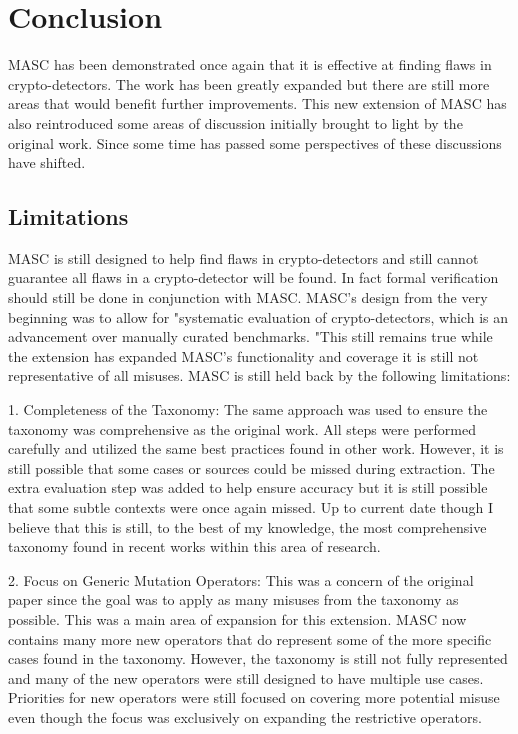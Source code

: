\chapter{Conclusion}
\label{chap_conclusion}

MASC has been demonstrated once again that it is effective at finding flaws in crypto-detectors. The work has been greatly expanded but there are still more areas that would benefit further improvements. This new extension of MASC has also reintroduced some areas of discussion initially brought to light by the original work. Since some time has passed some perspectives of these discussions have shifted.

\section{Limitations}
\label{ch6:sec:limitations}

MASC is still designed to help find flaws in crypto-detectors and still cannot guarantee all flaws in a crypto-detector will be found. In fact formal verification should still be done in conjunction with MASC. MASC's design from the very beginning was to allow for "systematic evaluation of crypto-detectors, which is an advancement over manually curated benchmarks. "This still remains true while the extension has expanded MASC's functionality and coverage it is still not representative of all misuses. MASC is still held back by the following limitations:

1. Completeness of the Taxonomy: The same approach was used to ensure the taxonomy was comprehensive as the original work. All steps were performed carefully and utilized the same best practices found in other work. However, it is still possible that some cases or sources could be missed during extraction. The extra evaluation step was added to help ensure accuracy but it is still possible that some subtle contexts were once again missed. Up to current date though I believe that this is still, to the best of my knowledge, the most comprehensive taxonomy found in recent works within this area of research.

2. Focus on Generic Mutation Operators: This was a concern of the original paper since the goal was to apply as many misuses from the taxonomy as possible. This was a main area of expansion for this extension. MASC now contains many more new operators that do represent some of the more specific cases found in the taxonomy. However, the taxonomy is still not fully represented and many of the new operators were still designed to have multiple use cases. Priorities for new operators were still focused on covering more potential misuse even though the focus was exclusively on expanding the restrictive operators.

